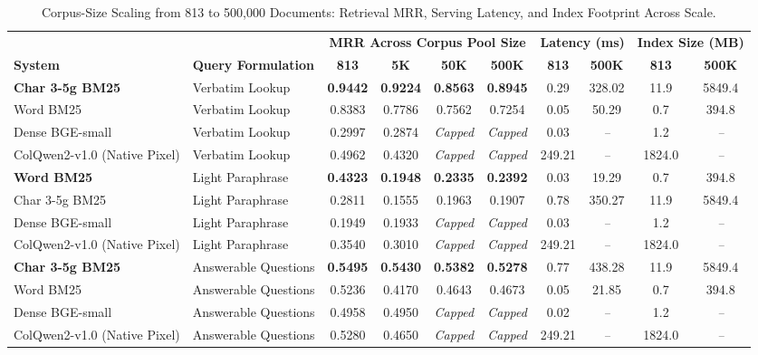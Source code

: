 \begin{table}[t]
\centering
\caption{Corpus-Size Scaling from 813 to 500,000 Documents: Retrieval MRR, Serving Latency, and Index Footprint Across Scale.}
\label{tab:corpus_scaling}
\small
\begin{tabular}{llcccccccc}
\toprule
& & \multicolumn{4}{c}{\textbf{MRR Across Corpus Pool Size}} & \multicolumn{2}{c}{\textbf{Latency (ms)}} & \multicolumn{2}{c}{\textbf{Index Size (MB)}} \\
\cmidrule(lr){3-6}\cmidrule(lr){7-8}\cmidrule(lr){9-10}
\textbf{System} & \textbf{Query Formulation} & \textbf{813} & \textbf{5K} & \textbf{50K} & \textbf{500K} & \textbf{813} & \textbf{500K} & \textbf{813} & \textbf{500K} \\
\midrule
\textbf{Char 3-5g BM25} & Verbatim Lookup & \textbf{0.9442} & \textbf{0.9224} & \textbf{0.8563} & \textbf{0.8945} & 0.29 & 328.02 & 11.9 & 5849.4 \\
Word BM25 & Verbatim Lookup & 0.8383 & 0.7786 & 0.7562 & 0.7254 & 0.05 & 50.29 & 0.7 & 394.8 \\
Dense BGE-small & Verbatim Lookup & 0.2997 & 0.2874 & \textit{Capped} & \textit{Capped} & 0.03 & \textit{--} & 1.2 & \textit{--} \\
ColQwen2-v1.0 (Native Pixel) & Verbatim Lookup & 0.4962 & 0.4320 & \textit{Capped} & \textit{Capped} & 249.21 & \textit{--} & 1824.0 & \textit{--} \\
\textbf{Word BM25} & Light Paraphrase & \textbf{0.4323} & \textbf{0.1948} & \textbf{0.2335} & \textbf{0.2392} & 0.03 & 19.29 & 0.7 & 394.8 \\
Char 3-5g BM25 & Light Paraphrase & 0.2811 & 0.1555 & 0.1963 & 0.1907 & 0.78 & 350.27 & 11.9 & 5849.4 \\
Dense BGE-small & Light Paraphrase & 0.1949 & 0.1933 & \textit{Capped} & \textit{Capped} & 0.03 & \textit{--} & 1.2 & \textit{--} \\
ColQwen2-v1.0 (Native Pixel) & Light Paraphrase & 0.3540 & 0.3010 & \textit{Capped} & \textit{Capped} & 249.21 & \textit{--} & 1824.0 & \textit{--} \\
\textbf{Char 3-5g BM25} & Answerable Questions & \textbf{0.5495} & \textbf{0.5430} & \textbf{0.5382} & \textbf{0.5278} & 0.77 & 438.28 & 11.9 & 5849.4 \\
Word BM25 & Answerable Questions & 0.5236 & 0.4170 & 0.4643 & 0.4673 & 0.05 & 21.85 & 0.7 & 394.8 \\
Dense BGE-small & Answerable Questions & 0.4958 & 0.4950 & \textit{Capped} & \textit{Capped} & 0.02 & \textit{--} & 1.2 & \textit{--} \\
ColQwen2-v1.0 (Native Pixel) & Answerable Questions & 0.5280 & 0.4650 & \textit{Capped} & \textit{Capped} & 249.21 & \textit{--} & 1824.0 & \textit{--} \\
\bottomrule
\end{tabular}
\end{table}
